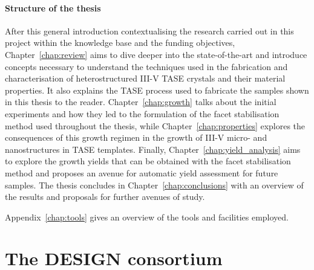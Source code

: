 \paragraph{Structure of the thesis} After this general introduction contextualising the research carried out in this project within the knowledge base and the funding objectives, Chapter~\ref{chap:review} aims to dive deeper into the state-of-the-art and introduce concepts necessary to understand the techniques used in the fabrication and characterisation of heterostructured III-V \acs{TASE} crystals and their material properties. It also explains the  \acs{TASE} process used to fabricate the samples shown in this thesis to the reader. Chapter~\ref{chap:growth} talks about the initial experiments and how they led to the formulation of the facet stabilisation method used throughout the thesis, while Chapter~\ref{chap:properties} explores the consequences of this growth regimen in the growth of III-V micro- and nanostructures in \acs{TASE} templates. Finally, Chapter~\ref{chap:yield_analysis} aims to explore the growth yields that can be obtained with the facet stabilisation method and proposes an avenue for automatic yield assessment for future samples. The thesis concludes in Chapter~\ref{chap:conclusions} with an overview of the results and proposals for further avenues of study. 

Appendix~\ref{chap:tools} gives an overview of the tools and facilities employed.
\par

\section{\texorpdfstring{The \acs{DESIGN} consortium}{The DESIGN-EID consortium}}

